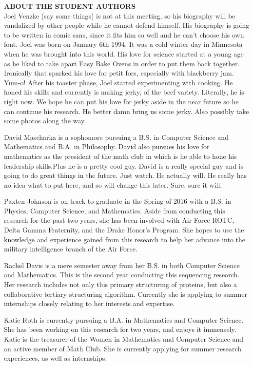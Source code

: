 \documentclass{article}
\begin{document}
\vspace{1cm}
\noindent\textbf{ABOUT THE STUDENT AUTHORS}\\
\indent Joel Venzke (say some things) is not at this meeting, so his biography will be vandalized by other people while he cannot defend himself. His biography is going to be written in comic sans, since it fits him so well and he can’t choose his own font. Joel was born on January 6th 1994. It was a cold winter day in Minnesota when he was brought into this world. His love for science started at a young age as he liked to take apart Easy Bake Ovens in order to put them back together. Ironically that sparked his love for petit fors, especially with blackberry jam. Yum-o! After his toaster phase, Joel started experimenting with cooking. He honed his skills and currently is making jerky, of the beef variety. Literally, he is right now. We hope he can put his love for jerky aside in the near future so he can continue his research. He better damn bring us some jerky. Also possibly take some photos along the way. 

David Mascharka is a sophomore pursuing a B.S. in Computer Science and Mathematics and B.A. in Philosophy. David also pursues his love for mathematics as the president of the math club in which is he able to hone his leadership skills.Plus he is a pretty cool guy. David is a really special guy and is going to do great things in the future. Just watch. He actually will. He really has no idea what to put here, and so will change this later. Sure, sure it will.

Paxten Johnson is on track to graduate in the Spring of 2016 with a B.S. in Physics, Computer Science, and Mathematics. Aside from conducting this research for the past two years, she has been involved with Air Force ROTC, Delta Gamma Fraternity, and the Drake Honor’s Program. She hopes to use the knowledge and experience gained from this research to help her advance into the military intelligence branch of the Air Force.

Rachel Davis is a mere semester away from her B.S. in both Computer Science and Mathematics. This is the second year conducting this sequencing research. Her research includes not only this primary structuring of proteins, but also a collaborative tertiary structuring algorithm. Currently she is applying to summer internships closely relating to her interests and expertise. 

Katie Roth is currently pursuing a B.A. in Mathematics and Computer Science. She has been working on this research for two years, and enjoys it immensely. Katie is the treasurer of the Women in Mathematics and Computer Science and an active member of Math Club. She is currently applying for summer research experiences, as well as internships. 
\end{document}
